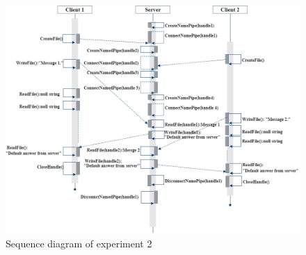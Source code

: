 \begin{figure}[H]
\centerline{\includegraphics[scale=0.55]{Figures/exp2}}
 \caption{Sequence diagram of experiment 2}
\label{exp2}
\end{figure}


